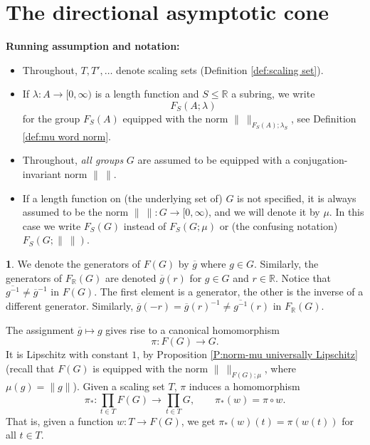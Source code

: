 \documentclass[12pt]{amsart}
\theoremstyle{definition}
\newtheorem{void}[prop]{}
\def\RR{\ensuremath{\mathbb{R}}}
\def\Free{F}
\begin{document}
%
%
\section{The directional asymptotic cone}
\label{Sec:diecrional asymptotic cone}




\noindent
{\bf Running assumption and notation:}
\begin{itemize}[leftmargin=*]
\item
Throughout, $T,T',\dots$ denote scaling sets (Definition \ref{def:scaling set}).

\item
If $\lambda \colon A \to [0,\infty)$ is a length function and $S \leq \RR$ a subring, we write
\[
\Free_S(A;\lambda)
\]
for the group $\Free_S(A)$ equipped with the norm $\| \ \|_{\Free_S(A);\lambda_S}$, see Definition \ref{def:mu word norm}.

\item
Throughout, {\em all groups} $G$ are assumed to be equipped with a conjugation-invariant norm $\| \ \|$.

\item
If a length function on (the underlying set of) $G$ is not specified, it is always assumed to be the norm $\| \ \| \colon G \to [0,\infty)$, and we will denote it by $\mu$.
In this case we write $\Free_S(G)$ instead of $\Free_S(G;\mu)$ or (the confusing notation) $\Free_S(G;\| \ \|)$.

\end{itemize}



\begin{void}\label{V:notation generators FRG}
We denote the generators of $\Free(G)$ by $\overline{g}$ where $g \in G$.
Similarly, the generators of $\Free_\RR(G)$ are denoted $\overline{g}(r)$ for $g \in G$ and $r \in \RR$.
Notice that $\overline{g^{-1}} \neq \overline{g}^{-1}$ in $\Free(G)$. 
The first element is a generator, the other is the inverse of a different generator. 
Similarly, $\overline{g}(-r) = \overline{g}(r)^{-1} \neq \overline{g^{-1}}(r)$ in $\Free_\RR(G)$.


The assignment $\overline{g} \mapsto g$ gives rise to a canonical homomorphism
\[
\pi \colon F(G) \to G.
\]
It is Lipschitz with constant $1$, by Proposition \ref{P:norm-mu universally Lipschitz} (recall that $\Free(G)$ is equipped with the norm $\| \ \|_{\Free(G);\mu}$, where $\mu(g)=\|g\|$).
Given a scaling set $T$, $\pi$ induces a homomorphism
\[
\pi_* \colon \prod_{t \in T} \Free(G) \to \prod_{t \in T} G, \qquad \pi_*(w) = \pi \circ w.
\]
That is, given a function $w \colon T \to \Free(G)$, we get $\pi_*(w)(t)=\pi(w(t))$ for all $t \in T$.
\end{void}
\end{document}
